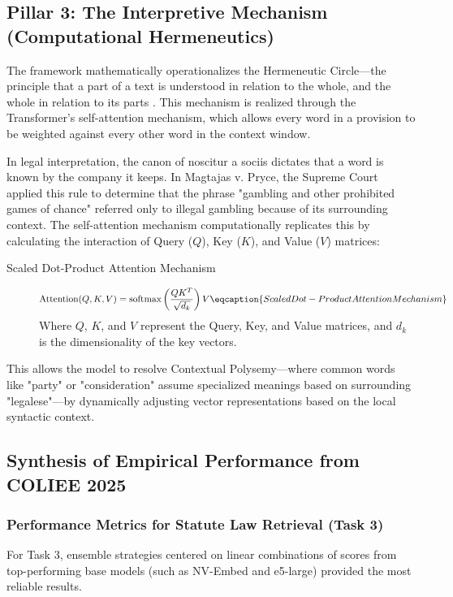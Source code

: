 \subsection{Pillar 3: The Interpretive Mechanism (Computational Hermeneutics)}
The framework mathematically operationalizes the Hermeneutic Circle—the principle that a part of a text is understood in relation to the whole, and the whole in relation to its parts \cite{Kommers2026Hermeneutics}. This mechanism is realized through the Transformer’s self-attention mechanism, which allows every word in a provision to be weighted against every other word in the context window\cite{Guenmayor2018CaseStudyHermeneutics}. 

In legal interpretation, the canon of noscitur a sociis dictates that a word is known by the company it keeps. In Magtajas v. Pryce, the Supreme Court applied this rule to determine that the phrase "gambling and other prohibited games of chance" referred only to illegal gambling because of its surrounding context. The self-attention mechanism computationally replicates this by calculating the interaction of Query ($Q$), Key ($K$), and Value ($V$) matrices:

\begin{description}
    \item[Scaled Dot-Product Attention Mechanism] \leavevmode
    \begin{equation}
        \text{Attention}(Q, K, V) = \text{softmax}\left(\frac{QK^T}{\sqrt{d_k}}\right)V
        \label{eq:scaled_dot_product_attention}
        \eqcaption{Scaled Dot-Product Attention Mechanism}
    \end{equation}
    \noindent Where $Q$, $K$, and $V$ represent the Query, Key, and Value matrices, and $d_k$ is the dimensionality of the key vectors.
\end{description}

This allows the model to resolve Contextual Polysemy—where common words like "party" or "consideration" assume specialized meanings based on surrounding "legalese"—by dynamically adjusting vector representations based on the local syntactic context.

\subsection{Synthesis of Empirical Performance from COLIEE 2025}

\subsubsection{Performance Metrics for Statute Law Retrieval (Task 3)}
For Task 3, ensemble strategies centered on linear combinations of scores from top-performing base models (such as NV-Embed and e5-large) provided the most reliable results.


